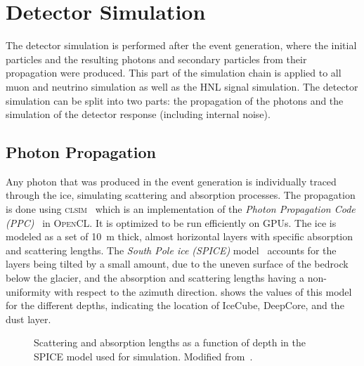\section{Detector Simulation} 

The detector simulation is performed after the event generation, where the initial particles and the resulting photons and secondary particles from their propagation were produced. This part of the simulation chain is applied to all muon and neutrino simulation as well as the HNL signal simulation. The detector simulation can be split into two parts: the propagation of the photons and the simulation of the detector response (including internal noise).


\subsection{Photon Propagation} 

Any photon that was produced in the event generation is individually traced through the ice, simulating scattering and absorption processes. The propagation is done using \textsc{clsim}~\cite{clsim} which is an implementation of the \textit{Photon Propagation Code (\textsc{PPC})}~ in \textsc{OpenCL}. It is optimized to be run efficiently on GPUs. The ice is modeled as a set of \SI{10}{\meter} thick, almost horizontal layers with specific absorption and scattering lengths. The \textit{South Pole ice (SPICE)} model~ accounts for the layers being tilted by a small amount, due to the uneven surface of the bedrock below the glacier, and the absorption and scattering lengths having a non-uniformity with respect to the azimuth direction.  shows the values of this model for the different depths, indicating the location of IceCube, DeepCore, and the dust layer.

\begin{figure}[h]
    
	\caption[Depth dependent scattering and absorption lengths]{Scattering and absorption lengths as a function of depth in the SPICE model used for simulation. Modified from~\cite{ATrettin_phd}.}
\end{figure}


